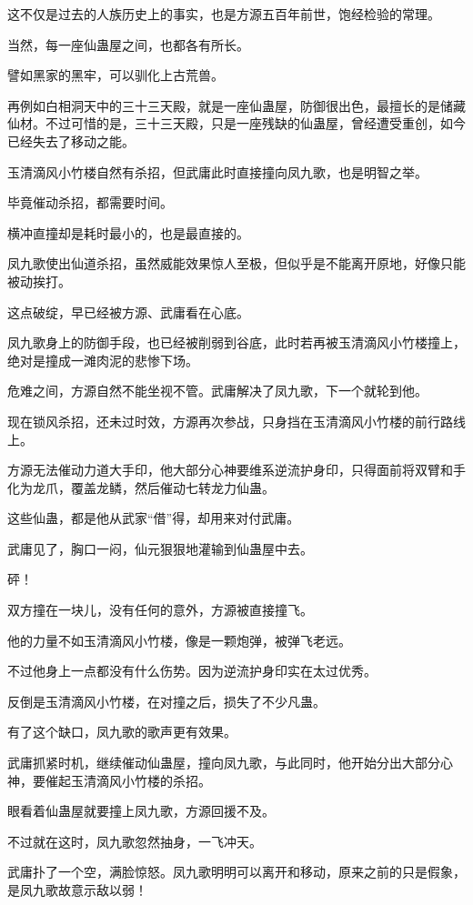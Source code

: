 \begin{this_body}
这不仅是过去的人族历史上的事实，也是方源五百年前世，饱经检验的常理。

当然，每一座仙蛊屋之间，也都各有所长。

譬如黑家的黑牢，可以驯化上古荒兽。

再例如白相洞天中的三十三天殿，就是一座仙蛊屋，防御很出色，最擅长的是储藏仙材。不过可惜的是，三十三天殿，只是一座残缺的仙蛊屋，曾经遭受重创，如今已经失去了移动之能。

玉清滴风小竹楼自然有杀招，但武庸此时直接撞向凤九歌，也是明智之举。

毕竟催动杀招，都需要时间。

横冲直撞却是耗时最小的，也是最直接的。

凤九歌使出仙道杀招，虽然威能效果惊人至极，但似乎是不能离开原地，好像只能被动挨打。

这点破绽，早已经被方源、武庸看在心底。

凤九歌身上的防御手段，也已经被削弱到谷底，此时若再被玉清滴风小竹楼撞上，绝对是撞成一滩肉泥的悲惨下场。

危难之间，方源自然不能坐视不管。武庸解决了凤九歌，下一个就轮到他。

现在锁风杀招，还未过时效，方源再次参战，只身挡在玉清滴风小竹楼的前行路线上。

方源无法催动力道大手印，他大部分心神要维系逆流护身印，只得面前将双臂和手化为龙爪，覆盖龙鳞，然后催动七转龙力仙蛊。

这些仙蛊，都是他从武家“借”得，却用来对付武庸。

武庸见了，胸口一闷，仙元狠狠地灌输到仙蛊屋中去。

砰！

双方撞在一块儿，没有任何的意外，方源被直接撞飞。

他的力量不如玉清滴风小竹楼，像是一颗炮弹，被弹飞老远。

不过他身上一点都没有什么伤势。因为逆流护身印实在太过优秀。

反倒是玉清滴风小竹楼，在对撞之后，损失了不少凡蛊。

有了这个缺口，凤九歌的歌声更有效果。

武庸抓紧时机，继续催动仙蛊屋，撞向凤九歌，与此同时，他开始分出大部分心神，要催起玉清滴风小竹楼的杀招。

眼看着仙蛊屋就要撞上凤九歌，方源回援不及。

不过就在这时，凤九歌忽然抽身，一飞冲天。

武庸扑了一个空，满脸惊怒。凤九歌明明可以离开和移动，原来之前的只是假象，是凤九歌故意示敌以弱！


\end{this_body}
